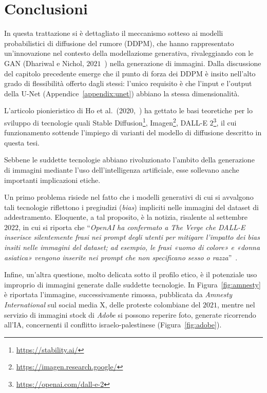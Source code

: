 \chapter{Conclusioni}

In questa trattazione si è dettagliato il meccanismo sotteso ai modelli probabilistici di diffusione del rumore (DDPM), che
hanno rappresentato un'innovazione nel contesto della modellaziome generativa, rivaleggiando con le GAN (Dhariwal e Nichol, $2021$~\cite{dhariwal2021}) 
nella generazione di immagini.
Dalla discussione del capitolo precedente emerge che il punto di forza dei DDPM è insito nell'alto grado di flessibilità 
offerto dagli stessi: l'unico requisito è che l'input e l'output della U-Net (Appendice~\ref{appendix:unet}) abbiano la stessa dimensionalità.


L'articolo pionieristico di Ho et al.\ (2020,~\cite{ho2020}) 
ha gettato le basi teoretiche per lo sviluppo di tecnologie quali Stable Diffusion\footnote{\url{https://stability.ai/}}, 
Imagen\footnote{\url{https://imagen.research.google/}}, DALL-E $2$\footnote{\url{https://openai.com/dall-e-2}}, 
il cui funzionamento sottende l'impiego di varianti del modello di diffusione descritto in questa tesi.

Sebbene le suddette tecnologie abbiano rivoluzionato l'ambito della generazione di immagini mediante l'uso dell'intelligenza artificiale, 
esse sollevano anche importanti implicazioni etiche.

Un primo problema risiede nel fatto che i modelli generativi di cui si avvalgono tali tecnologie riflettono 
i pregiudizi (\emph{bias}) impliciti nelle immagini del dataset di addestramento. Eloquente, a tal proposito, è la notizia, risalente al settembre $2022$, 
in cui si riporta che “\emph{OpenAI ha confermato a The Verge che DALL-E inserisce silentemente frasi nei prompt degli utenti per 
mitigare l'impatto dei bias insiti nelle immagini del dataset; ad esempio, le frasi «uomo di colore» e «donna asiatica» 
vengono inserite nei prompt che non specificano sesso o razza}”~\cite{DALLE2023}.

Infine, un'altra questione, molto delicata sotto il profilo etico, è il potenziale uso improprio di immagini generate dalle suddette tecnologie. 
In Figura~\ref{fig:amnesty} è riportata l'immagine, successivamente rimossa, pubblicata da \emph{Amnesty International} sul social media X, 
delle proteste colombiane del $2021$, mentre nel servizio di immagini stock di \emph{Adobe} 
si possono reperire foto, generate ricorrendo all'IA, concernenti il conflitto israelo-palestinese (Figura~\ref{fig:adobe}).

